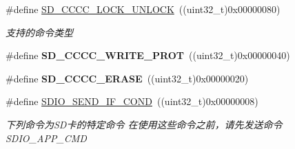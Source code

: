 \begin{DoxyCompactItemize}
\item 
\#define \hyperlink{group__sd__card__private_gac93a99c6a0f8999f37e690d6955872ac}{S\+D\+\_\+\+C\+C\+C\+C\+\_\+\+L\+O\+C\+K\+\_\+\+U\+N\+L\+O\+CK}~((uint32\+\_\+t)0x00000080)\hypertarget{group__sd__card__private_gac93a99c6a0f8999f37e690d6955872ac}{}\label{group__sd__card__private_gac93a99c6a0f8999f37e690d6955872ac}

\begin{DoxyCompactList}\small\item\em 支持的命令类型 \end{DoxyCompactList}\item 
\#define {\bfseries S\+D\+\_\+\+C\+C\+C\+C\+\_\+\+W\+R\+I\+T\+E\+\_\+\+P\+R\+OT}~((uint32\+\_\+t)0x00000040)\hypertarget{group__sd__card__private_gad8cbc04a4adf7c5588ddeb8e29f391f2}{}\label{group__sd__card__private_gad8cbc04a4adf7c5588ddeb8e29f391f2}

\item 
\#define {\bfseries S\+D\+\_\+\+C\+C\+C\+C\+\_\+\+E\+R\+A\+SE}~((uint32\+\_\+t)0x00000020)\hypertarget{group__sd__card__private_gaf8f161db032555d848d233e6883e1ddf}{}\label{group__sd__card__private_gaf8f161db032555d848d233e6883e1ddf}

\item 
\#define \hyperlink{group__sd__card__private_gafe1c9bdbdccf901be62203bf5547147e}{S\+D\+I\+O\+\_\+\+S\+E\+N\+D\+\_\+\+I\+F\+\_\+\+C\+O\+ND}~((uint32\+\_\+t)0x00000008)\hypertarget{group__sd__card__private_gafe1c9bdbdccf901be62203bf5547147e}{}\label{group__sd__card__private_gafe1c9bdbdccf901be62203bf5547147e}

\begin{DoxyCompactList}\small\item\em 下列命令为\+S\+D卡的特定命令 在使用这些命令之前，请先发送命令 S\+D\+I\+O\+\_\+\+A\+P\+P\+\_\+\+C\+MD \end{DoxyCompactList}\end{DoxyCompactItemize}

